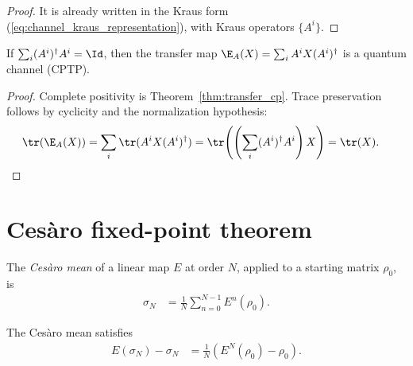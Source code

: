 \begin{proof}\leanok
    It is already written in the Kraus form
    (\ref{eq:channel_kraus_representation}), with Kraus operators
    $\{A^i\}$.
\end{proof}

\begin{theorem}\label{thm:transfer_channel}
    \leanok
    If $\sum_i(A^i)^\dagger A^i=\Id$, then the transfer map
    $\E_A(X)=\sum_i A^iX(A^i)^\dagger$ is a quantum channel (CPTP).
\end{theorem}

\begin{proof}\leanok{}
    Complete positivity is Theorem~\ref{thm:transfer_cp}. Trace preservation
    follows by cyclicity and the normalization hypothesis:
    \begin{align}
        \tr(\E_A(X))
         & =\sum_i\tr(A^iX(A^i)^\dagger)
        =\tr\!\left(\left(\sum_i(A^i)^\dagger A^i\right)X\right)
        =\tr(X).
        \notag
    \end{align}
\end{proof}

\section{Ces\`aro fixed-point theorem}

\begin{definition}\label{def:cesaro_mean}
    \leanok
    The \emph{Ces\`aro mean} of a linear map $E$ at order $N$,
    applied to a starting matrix $\rho_0$, is
    \begin{align}
        \sigma_N
         & =\frac{1}{N}\sum_{n=0}^{N-1}E^n(\rho_0).
        \label{eq:channel_cesaro_mean}
    \end{align}
\end{definition}

\begin{theorem}\label{thm:cesaro_telescope}
    \leanok
    The Ces\`aro mean satisfies
    \begin{align}
        E(\sigma_N)-\sigma_N
         & =\frac{1}{N}(E^N(\rho_0)-\rho_0).
        \label{eq:channel_cesaro_telescope}
    \end{align}
\end{theorem}

